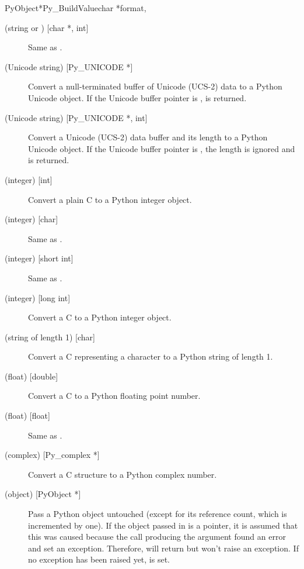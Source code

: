\begin{cfuncdesc}{PyObject*}{Py_BuildValue}{char *format,
                                            \moreargs}
\begin{description}
    \item[ (string or ) {[char *, int]}]
    Same as .

    \item[ (Unicode string) {[Py_UNICODE *]}]
    Convert a null-terminated buffer of Unicode (UCS-2) data to a
    Python Unicode object.  If the Unicode buffer pointer is \NULL,
     is returned.

    \item[ (Unicode string) {[Py_UNICODE *, int]}]
    Convert a Unicode (UCS-2) data buffer and its length to a Python
    Unicode object.   If the Unicode buffer pointer is \NULL, the
    length is ignored and  is returned.

    \item[ (integer) {[int]}]
    Convert a plain C  to a Python integer object.

    \item[ (integer) {[char]}]
    Same as .

    \item[ (integer) {[short int]}]
    Same as .

    \item[ (integer) {[long int]}]
    Convert a C  to a Python integer object.

    \item[ (string of length 1) {[char]}]
    Convert a C  representing a character to a Python
    string of length 1.

    \item[ (float) {[double]}]
    Convert a C  to a Python floating point number.

    \item[ (float) {[float]}]
    Same as .

    \item[ (complex) {[Py_complex *]}]
    Convert a C  structure to a Python complex
    number.

    \item[ (object) {[PyObject *]}]
    Pass a Python object untouched (except for its reference count,
    which is incremented by one).  If the object passed in is a
    \NULL{} pointer, it is assumed that this was caused because the
    call producing the argument found an error and set an exception.
    Therefore,  will return \NULL{} but
    won't raise an exception.  If no exception has been raised yet,
     is set.


\end{description}
\end{cfuncdesc}
